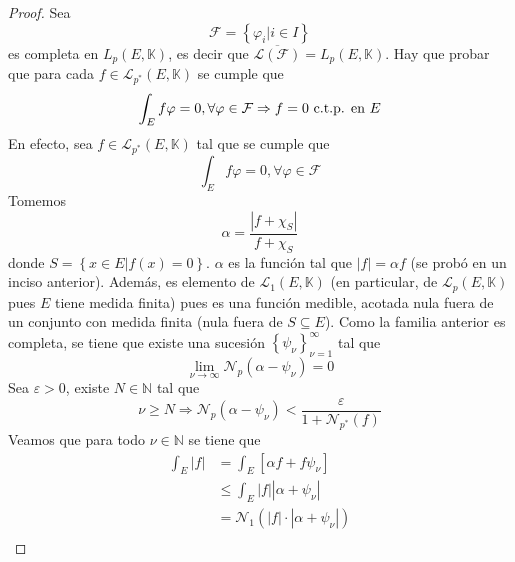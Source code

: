 \documentclass[12pt]{report}
\theoremstyle{largebreak}
\newcommand\abs[1]{\ensuremath{\left|#1\right|}}
\newcommand{\N}[2]{\ensuremath{\mathcal{N}_{#1}\left(#2\right)}}
\begin{document}
    \begin{proof}
        Sea
        \begin{equation*}
            \mathcal{F}=\left\{\varphi_i\Big|i\in I \right\}
        \end{equation*}
        es completa en $L_p(E,\mathbb{K})$, es decir que $\overline{\mathcal{L}(\mathcal{F})}=L_p(E,\mathbb{K})$. Hay que probar que para cada $f\in\mathcal{L}_{ p^*}(E,\mathbb{K})$ se cumple que
        \begin{equation*}
            \int_E f\varphi=0,\forall\varphi\in\mathcal{F} \Rightarrow f=0\textup{ c.t.p. en }E
        \end{equation*}
        En efecto, sea $f\in\mathcal{L}_{ p^*}(E,\mathbb{K})$ tal que se cumple que
        \begin{equation*}
            \int_E f\varphi=0,\forall\varphi\in\mathcal{F}
        \end{equation*}
        Tomemos
        \begin{equation*}
            \alpha=\frac{\abs{f+\chi_S}}{f+\chi_S}
        \end{equation*}
        donde $S=\left\{x\in E\Big|f(x)=0\right\}$. $\alpha$ es la función tal que $\abs{f}=\alpha f$ (se probó en un inciso anterior). Además, es elemento de $\mathcal{L}_1(E,\mathbb{K})$ (en particular, de $\mathcal{L}_p(E,\mathbb{K})$ pues $E$ tiene medida finita) pues es una función medible, acotada nula fuera de un conjunto con medida finita (nula fuera de $S\subseteq E$). Como la familia anterior es completa, se tiene que existe una sucesión $\left\{\psi_\nu \right\}_{ \nu=1}^\infty$ tal que
        \begin{equation*}
            \lim_{ \nu\rightarrow\infty}\N{p}{\alpha-\psi_\nu}=0
        \end{equation*}
        Sea $\varepsilon>0$, existe $N\in\mathbb{N}$ tal que
        \begin{equation*}
            \nu\geq N\Rightarrow \N{p}{\alpha-\psi_\nu}<\frac{\varepsilon}{1+\N{p^*}{f}}
        \end{equation*}
        Veamos que para todo $\nu\in\mathbb{N}$ se tiene que
        \begin{equation*}
            \begin{split}
                \int_E\abs{f}&=\int_E\left[\alpha f+f\psi_\nu\right]\\
                &\leq\int_E\abs{f}\abs{\alpha+\psi_\nu}\\
                &=\N{1}{\abs{f}\cdot\abs{\alpha+\psi_\nu}}\\

\end{split}
\end{equation*}
\end{proof}
\end{document}
